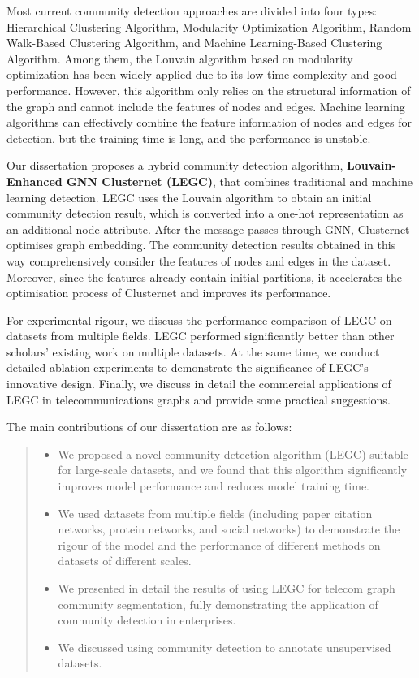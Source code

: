 \documentclass[ %
                    author={Tengyao Tu},
                supervisor={Dr. James Pope},
                    degree={MSc},
                     title={A New Perspective on Graph Community Detection: Combining Traditional Methods with Deep Learning Approaches},
                  subtitle={Applying to Telecom Networks and Diverse Datasets},
                      type={},
                      year={2024}]{dissertation}
\begin{document}
Most current community detection approaches are divided into four types: Hierarchical Clustering Algorithm, Modularity Optimization Algorithm, Random Walk-Based Clustering Algorithm, and Machine Learning-Based Clustering Algorithm. Among them, the Louvain algorithm based on modularity optimization has been widely applied due to its low time complexity and good performance. However, this algorithm only relies on the structural information of the graph and cannot include the features of nodes and edges. Machine learning algorithms can effectively combine the feature information of nodes and edges for detection, but the training time is long, and the performance is unstable.

Our dissertation proposes a hybrid community detection algorithm, \textbf{Louvain-Enhanced GNN Clusternet (LEGC)}, that combines traditional and machine learning detection. LEGC uses the Louvain algorithm to obtain an initial community detection result, which is converted into a one-hot representation as an additional node attribute. After the message passes through GNN, Clusternet optimises graph embedding. The community detection results obtained in this way comprehensively consider the features of nodes and edges in the dataset. Moreover, since the features already contain initial partitions, it accelerates the optimisation process of Clusternet and improves its performance. 

For experimental rigour, we discuss the performance comparison of LEGC on datasets from multiple fields. LEGC performed significantly better than other scholars' existing work on multiple datasets. At the same time, we conduct detailed ablation experiments to demonstrate the significance of LEGC's innovative design. Finally, we discuss in detail the commercial applications of LEGC in telecommunications graphs and provide some practical suggestions.

The main contributions of our dissertation are as follows:
\begin{quote}
\noindent
\begin{itemize}
\item We proposed a novel community detection algorithm (LEGC) suitable for large-scale datasets, and we found that this algorithm significantly improves model performance and reduces model training time.
\item We used datasets from multiple fields (including paper citation networks, protein networks, and social networks) to demonstrate the rigour of the model and the performance of different methods on datasets of different scales.
\item We presented in detail the results of using LEGC for telecom graph community segmentation, fully demonstrating the application of community detection in enterprises.
\item We discussed using community detection to annotate unsupervised datasets.
\end{itemize}
\end{quote}
\end{document}
